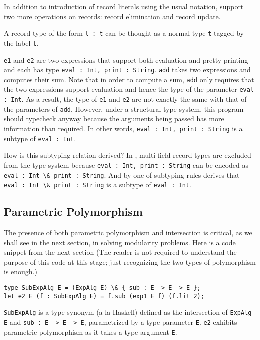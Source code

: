 \documentclass[preprint]{sigplanconf}
\begin{document}
In addition to introduction of record literals using the usual notation, \name
support two more operations on records: record elimination and record update.

A record type of the form \lstinline{l : t} can be thought as a normal type \lstinline{t}
tagged by the label \lstinline{l}.



\lstinline{e1} and \lstinline{e2} are two expressions that support both evaluation and pretty
printing and each has type \lstinline{eval : Int, print : String}. \lstinline{add} takes
two expressions and computes their sum. Note that in order to compute a sum,
\lstinline{add} only requires that the two expressions support evaluation and hence the
type of the parameter \lstinline{eval : Int}. As a result, the type of \lstinline{e1} and
\lstinline{e2} are not exactly the same with that of the parameters of \lstinline{add}. However,
under a structural type system, this program should typecheck anyway because the
arguments being passed has more information than required. In other words,
\lstinline{eval : Int, print : String} is a subtype of \lstinline{eval : Int}.

How is this subtyping relation derived? In \name, multi-field record types are
excluded from the type system because \lstinline{eval : Int, print : String} can
be encoded as \lstinline{eval : Int \& print : String}. And by one of
subtyping rules derives that \lstinline{eval : Int \& print : String} is a
subtype of \lstinline{eval : Int}.



\subsection{Parametric Polymorphism}

The presence of both parametric polymorphism and intersection is critical, as we
shall see in the next section, in solving modularity problems. Here is a code
snippet from the next section (The reader is not required to understand the
purpose of this code at this stage; just recognizing the two types of
polymorphism is enough.)
\begin{lstlisting}
type SubExpAlg E = (ExpAlg E) \& { sub : E -> E -> E };
let e2 E (f : SubExpAlg E) = f.sub (exp1 E f) (f.lit 2);
\end{lstlisting}
\lstinline{SubExpAlg} is a type synonym (a la Haskell) defined as the intersection of
\lstinline{ExpAlg E} and \lstinline{sub : E -> E -> E}, parametrized by a type parameter
\lstinline{E}. \lstinline{e2} exhibits parametric polymorphism as it takes a type argument
\lstinline{E}.
\end{document}
